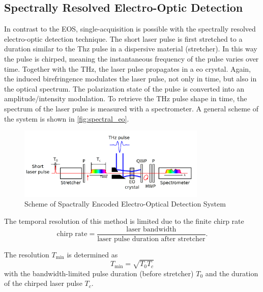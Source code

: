 \subsection{Spectrally Resolved Electro-Optic Detection}
In contrast to the EOS, single-acquisition is possible with the spectrally resolved electro-optic detection technique. %
The short laser pulse is first stretched to a duration similar to the Thz pulse in a dispersive material (stretcher).
In this way the pulse is chirped, meaning the instantaneous frequency of the pulse varies over time.
Together with the THz, the laser pulse propagates in a \gls{eo} crystal.
Again, the induced birefringence modulates the laser pulse, not only in time, but also in the optical spectrum.
The polarization state of the pulse is converted into an amplitude/intensity modulation.
To retrieve the THz pulse shape in time, the spectrum of the laser pulse is measured with a spectrometer. %
A general scheme of the system is shown in \autoref{fig:spectral_eo}. \cite{roussel2014}

\begin{figure}[tbh]
 	\centering
 	\includegraphics[width = 0.8\textwidth]{chap/02-theory/img/spectral_eo}
 	\caption{Scheme of Spactrally Encoded Electro-Optical Detection System \cite{roussel2014}}
 	\label{fig:spectral_eo}
\end{figure}

The temporal resolution of this method is limited due to the finite chirp rate
\begin{equation}
\text{chirp rate} = \frac{\text{laser bandwidth}}{\text{laser pulse duration after stretcher}}.
\end{equation}

The resolution $T_{\text{min}}$ is determined as
\begin{equation}
T_{\text{min}} = \sqrt{T_0 T_c}
\end{equation}
with the bandwidth-limited pulse duration (before stretcher) $T_0$ and the duration of the chirped laser pulse $T_c$.

